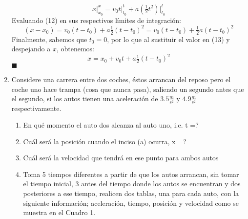 \documentclass[letterpaper,12pt]{article}
\begin{document}
\begin{enumerate}
\begin{equation}
        x\Big|_{x_0}^x = v_{0}t \Big|_{t_0}^t + a (\tfrac{1}{2}t^2)\Big|_{t_0}^t
    \end{equation}
Evaluando (12) en sus respectivos límites de integración:
    \begin{equation}
        (x-x_0) = v_{0}(t - t_0) + a \tfrac{1}{2}(t-t_0)^2= v_{0}(t - t_0) +  \tfrac{1}{2}a(t-t_0)^2
    \end{equation}
Finalmente, sabemos que $t_0=0$, por lo que al sustituir el valor en (13) y despejando a $x$, obtenemos:
    \begin{equation}
        x = x_0 + v_{0}t + a\tfrac{1}{2}(t-t_0)^2
    \end{equation}
\hspace{16.5cm}$\blacksquare$

    \item Considere una carrera entre dos coches, éstos arrancan del reposo pero el coche uno hace trampa (cosa que nunca pasa), saliendo un segundo antes que el segundo, si los autos tienen una aceleración de $3.5 \frac{m}{s^2}$ y $4.9 \frac{m}{s^2}$ respectivamente.
    \begin{enumerate}
        \item En qué momento el auto dos alcanza al auto uno, i.e. t =?
        \item Cuál será la posición cuando el inciso (a) ocurra, x =?
        \item Cuál será la velocidad que tendrá en ese punto para ambos autos
        \item Toma 5 tiempos diferentes a partir de que los autos arrancan, sin tomar el tiempo inicial, 3 antes del tiempo donde los autos se encuentran y dos posteriores a ese tiempo, realicen dos tablas, una para cada auto, con la siguiente información; aceleración, tiempo, posición y velocidad como se muestra en el Cuadro 1.
    \end{enumerate}

\end{enumerate}
\end{document}
